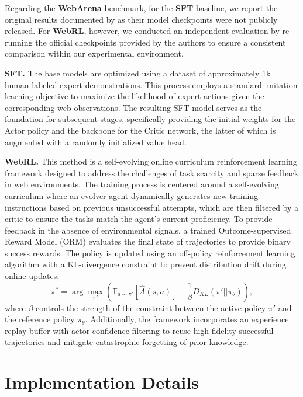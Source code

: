 Regarding the \textbf{WebArena} benchmark, for the \textbf{SFT} baseline, we report the original results documented by \citet{webrl} as their model checkpoints were not publicly released. For \textbf{WebRL}, however, we conducted an independent evaluation by re-running the official checkpoints provided by the authors to ensure a consistent comparison within our experimental environment.

\textbf{SFT.} The base models are optimized using a dataset of approximately 1k human-labeled expert demonstrations. This process employs a standard imitation learning objective to maximize the likelihood of expert actions given the corresponding web observations. The resulting SFT model serves as the foundation for subsequent stages, specifically providing the initial weights for the Actor policy and the backbone for the Critic network, the latter of which is augmented with a randomly initialized value head.

\textbf{WebRL.} \citep{webrl} This method is a self-evolving online curriculum reinforcement learning framework designed to address the challenges of task scarcity and sparse feedback in web environments. The training process is centered around a self-evolving curriculum where an evolver agent dynamically generates new training instructions based on previous unsuccessful attempts, which are then filtered by a critic to ensure the tasks match the agent's current proficiency. To provide feedback in the absence of environmental signals, a trained Outcome-supervised Reward Model (ORM) evaluates the final state of trajectories to provide binary success rewards. The policy is updated using an off-policy reinforcement learning algorithm with a KL-divergence constraint to prevent distribution drift during online updates:
\begin{equation}
    \pi^* = \arg \max_{\pi'} \left( \mathbb{E}_{a \sim \pi'} [\hat{A}(s, a)] - \frac{1}{\beta} D_{KL}(\pi' || \pi_\theta) \right),
\end{equation}
where $\beta$ controls the strength of the constraint between the active policy $\pi'$ and the reference policy $\pi_\theta$. Additionally, the framework incorporates an experience replay buffer with actor confidence filtering to reuse high-fidelity successful trajectories and mitigate catastrophic forgetting of prior knowledge.

\section{Implementation Details}
\label{app:implementation}


